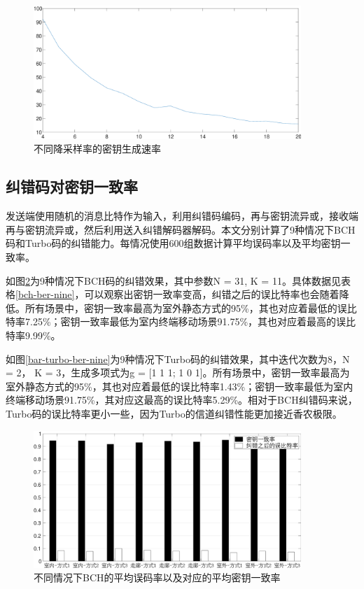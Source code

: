\documentclass[master]{seuthesis} %
\begin{document}
\begin{Main}
\begin{figure}[htbp!]
    \centering \includegraphics[width=0.9\textwidth]{images/keyrate.eps}
    \caption{不同降采样率的密钥生成速率}
    \label{keyrate}
\end{figure}


\subsection{纠错码对密钥一致率}

发送端使用随机的消息比特作为输入，利用纠错码编码，再与密钥流异或，接收端再与密钥流异或，然后利用送入纠错解码器解码。本文分别计算了9种情况下BCH码和Turbo码的纠错能力。每情况使用600组数据计算平均误码率以及平均密钥一致率。

如图\ref{bar-bch-ber-nine}为9种情况下BCH码的纠错效果，其中参数N = 31, K = 11。具体数据见表格\ref{bch-ber-nine}，可以观察出密钥一致率变高，纠错之后的误比特率也会随着降低。所有场景中，密钥一致率最高为室外静态方式的95\%，其也对应着最低的误比特率7.25\%；密钥一致率最低为室内终端移动场景91.75\%，其也对应着最高的误比特率9.99\%。

如图\ref{bar-turbo-ber-nine}为9种情况下Turbo码的纠错效果，其中迭代次数为8，N = 2， K = 3，生成多项式为g = [1 1 1; 1 0 1]。所有场景中，密钥一致率最高为室外静态方式的95\%，其也对应着最低的误比特率1.43\%；密钥一致率最低为室内终端移动场景91.75\%，其对应这最高的误比特率5.29\%。相对于BCH纠错码来说，Turbo码的误比特率更小一些，因为Turbo的信道纠错性能更加接近香农极限。

\begin{figure}[htbp!]
    \centering \includegraphics[width=0.9\textwidth]{images/tdd-encode/bch-ber-nine.eps}
    \caption{不同情况下BCH的平均误码率以及对应的平均密钥一致率}
    \label{bar-bch-ber-nine}
\end{figure}


\end{Main}
\end{document}
